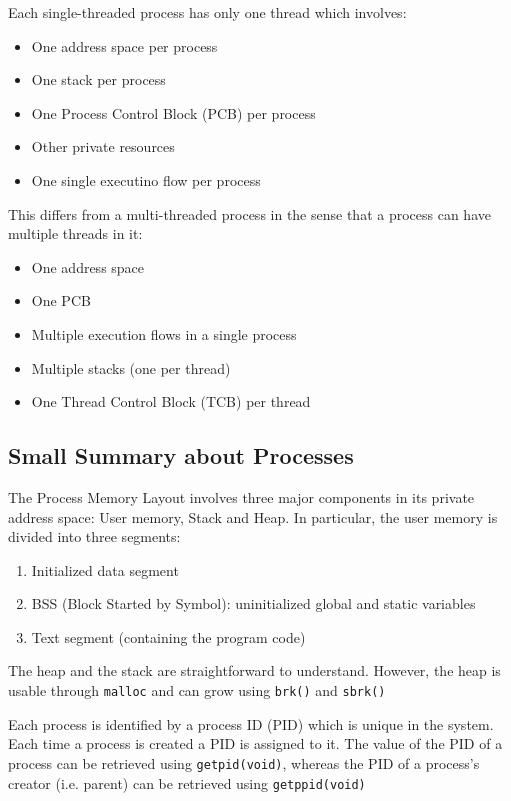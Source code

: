 Each single-threaded process has only one thread which involves:
\begin{itemize}
    \item One address space per process
    \item One stack per process
    \item One Process Control Block (PCB) per process
    \item Other private resources
    \item One single executino flow per process
\end{itemize}

This differs from a multi-threaded process in the sense that a process can have multiple threads in it:
\begin{itemize}
    \item One address space
    \item One PCB
    \item Multiple execution flows in a single process
    \item Multiple stacks (one per thread)
    \item One Thread Control Block (TCB) per thread
\end{itemize}

\subsection{Small Summary about Processes}
The Process Memory Layout involves three major components in its private address space: User memory, Stack and Heap.
In particular, the user memory is divided into three segments:
\begin{enumerate}
    \item Initialized data segment
    \item BSS (Block Started by Symbol): uninitialized global and static variables
    \item Text segment (containing the program code)
\end{enumerate}
The heap and the stack are straightforward to understand. However, the heap is usable through \texttt{malloc} and can grow using \texttt{brk()} and \texttt{sbrk()}

Each process is identified by a process ID (PID) which is unique in the system. Each time a process is created a PID is assigned to it. The value of the PID of a process can be retrieved using \texttt{getpid(void)}, whereas the PID of a process's creator (i.e. parent) can be retrieved using \texttt{getppid(void)}

